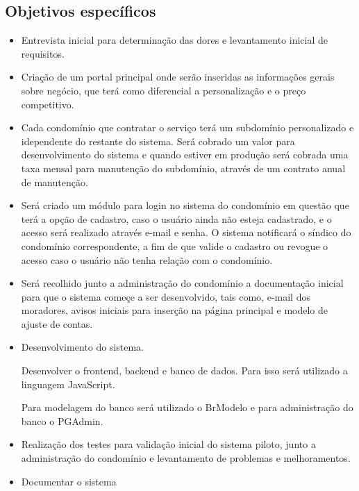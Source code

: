 \subsection{Objetivos específicos}
\begin{itemize}
    \item Entrevista inicial para determinação das dores e levantamento
    inicial de requisitos.
            
    \item Criação de um portal principal onde serão inseridas as informações gerais
sobre negócio, que terá como diferencial a personalização e o preço competitivo.
    
    \item Cada condomínio que contratar o serviço terá um subdomínio personalizado
e idependente do restante do sistema. Será cobrado um valor para desenvolvimento
do sistema e quando estiver em produção será cobrada uma taxa mensal para manutenção
do subdomínio, através de um contrato anual de manutenção.

    \item Será criado um módulo para login no sistema do condomínio em questão
que terá a opção de cadastro, caso o usuário ainda não esteja cadastrado,
e o acesso será realizado através e-mail e senha. O sistema notificará o síndico
do condomínio correspondente, a fim de que valide o cadastro ou revogue o acesso
caso o usuário não tenha relação com o condomínio.

    \item Será recolhido junto a administração do condomínio a documentação 
inicial para que o sistema começe a ser desenvolvido, tais como, e-mail
dos moradores, avisos iniciais para inserção na página principal e modelo de
ajuste de contas.

    \item Desenvolvimento do sistema.
    
    Desenvolver o frontend, backend e banco de dados. Para isso será 
utilizado a linguagem JavaScript.

    Para modelagem do banco será utilizado o BrModelo e para administração do banco
o PGAdmin.

    \item Realização dos testes para validação inicial do sistema piloto, junto a
administração do condomínio e levantamento de problemas e melhoramentos.

    \item Documentar o sistema
    
\end{itemize}

